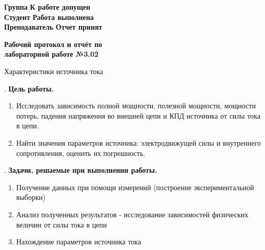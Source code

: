 \documentclass[12pt]{article}
\begin{document}
    \vspace*{2\baselineskip}

    \thispagestyle{fancy}

    \noindent
    \textbf{Группа} \underline{\hspace{4.85cm}} \hfill \textbf{К работе допущен} \underline{\hspace{4cm}} \\[0.5cm]
    \textbf{Студент} \underline{\hspace{4.6cm}} \hfill \textbf{Работа выполнена} \underline{\hspace{4cm}} \\[0.5cm]
    \textbf{Преподаватель} \underline{\hspace{3.2cm}} \hfill \textbf{Отчет принят} \underline{\hspace{4.85cm}} \\


    \begin{center}
    {\huge \textbf{Рабочий протокол и отчёт по\\ лабораторной работе №3.02}}

        \smallvspace

        {\Large Характеристики источника тока}
    \end{center}


    . \textbf{Цель работы.}

    \begin{enumerate}
        \item Исследовать зависимость полной мощности, полезной мощности,
        мощности потерь, падения напряжения во внешней цепи и КПД
        источника от силы тока в цепи.
        
        \item Найти значения параметров источника: электродвижущей силы и
        внутреннего сопротивления, оценить их погрешность.
    \end{enumerate}

    \mediumvspace

    . \textbf{Задачи, решаемые при выполнении работы.}

    \begin{enumerate}
        \item Получение данных при помощи измерений (построение экспериментальной выборки)
        \item Анализ полученных результатов - исследование зависимостей физических величин от силы тока в цепи
        \item Нахождение параметров источника тока
    \end{enumerate}
\end{document}
